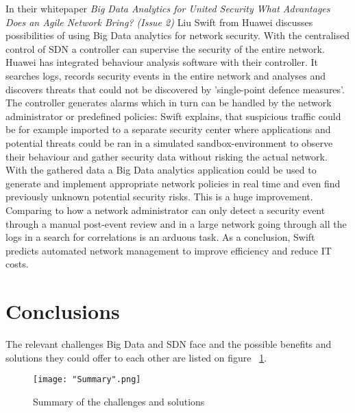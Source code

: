 \documentclass{acm_proc_article-sp}
\begin{document}
In their whitepaper \textit{Big Data Analytics for United Security \textendash What Advantages Does an Agile Network Bring? (Issue 2)} \cite{Liu2014} Liu Swift from Huawei discusses possibilities of using Big Data analytics for network security. With the centralised control of SDN a controller can supervise the security of the entire network. Huawei has integrated behaviour analysis software with their controller. It searches logs, records security events in the entire network and analyses and discovers threats that could not be discovered by 'single-point defence measures'. The controller generates alarms which in turn can be handled by the network administrator or predefined policies: Swift explains, that suspicious traffic could be for example imported to a separate security center where applications and potential threats could be ran in a simulated sandbox-environment to observe their behaviour and gather security data without risking the actual network. With the gathered data a Big Data analytics application could be used to generate and implement appropriate network policies in real time and even find previously unknown potential security risks. This is a huge improvement. Comparing to how a network administrator can only detect a security event through a manual post-event review and in a large network going through all the logs in a search for correlations is an arduous task. As a conclusion, Swift predicts automated network management to improve efficiency and reduce IT costs. 

\section{Conclusions}

The relevant challenges Big Data and SDN face and the possible benefits and solutions they could offer to each other are listed on figure ~\ref{fig:summary}.

\begin{figure}[ht]
\centering
{}
\texttt{[image: "Summary".png]}
\caption{Summary of the challenges and solutions}
\label{fig:summary}
\end{figure} 
\end{document}
